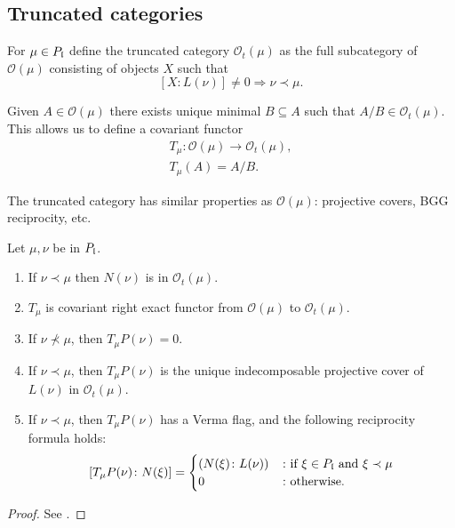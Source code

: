 \documentclass[a4paper,10pt]{article}
\begin{document}
\subsection{Truncated categories}


\begin{definition}
 For $\mu \in P_{\mathfrak{l}}$ define the truncated category $\mathcal{O}_t(\mu)$ as the full subcategory of $\mathcal{O}(\mu)$ consisting of objects $X$ such that
 \[
  [X : L(\nu)] \neq 0 \Longrightarrow \nu \prec \mu.
 \]

Given $A \in \mathcal{O}(\mu)$ there exists unique minimal $B \subseteq A$ such that $A/B \in \mathcal{O}_t(\mu)$. This allows us to define a covariant functor
\begin{gather*}
 T_\mu\colon \mathcal{O}(\mu) \to \mathcal{O}_t(\mu), \\
 T_\mu (A) = A / B.
\end{gather*}
\end{definition}

The truncated category has similar properties as $\mathcal{O}(\mu)$: projective covers, BGG reciprocity, etc.
%
\begin{lemma}
\label{lemma:truncated_category}
Let $\mu, \nu$ be in $P_{\mathfrak{l}}$.
\begin{enumerate}
\item If $\nu \prec \mu$ then $N(\nu)$ is in $\mathcal{O}_t(\mu).$

\item $T_\mu$ is covariant right exact functor from $\mathcal{O}(\mu)$ to $\mathcal{O}_t(\mu).$

\item If $\nu \not\prec \mu$, then $T_\mu P(\nu) =0$.

\item If $\nu \prec \mu$, then $T_\mu P(\nu)$ is the unique indecomposable projective cover of $L(\nu)$ in $\mathcal{O}_t(\mu)$.

\item
\label{item:truncated_category_reciprocity} If $\nu \prec \mu$, then $T_\mu P(\nu)$ has a Verma flag, and the following reciprocity formula holds:
%
\[ [T_\mu P(\nu)\colon N(\xi) ]= \begin{cases} (N(\xi) \colon L(\nu)) & \colon \text{if $\xi \in P_{\mathfrak{l}}$ and $\xi \prec \mu$}
\\ 0 & \colon \text{otherwise}.\end{cases} \]
%
\end{enumerate}
\end{lemma}
\begin{proof}
See \cite[\S2.]{es}.
\end{proof}
\end{document}
